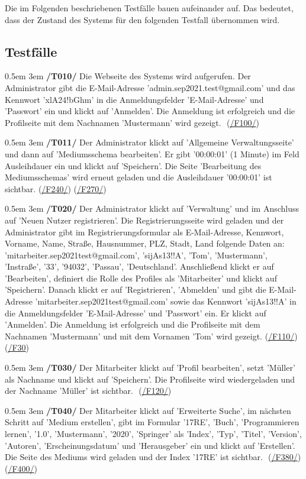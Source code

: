 \documentclass{article}
\newcommand{\specification}[3]{
	{\parindent 0.5em \hangindent 3em \hypertarget{spec:#1:#2}{\textbf{/#1#2/}} #3 \par \nobreak \vspace*{0.5em}}
}
\begin{document}
Die im Folgenden beschriebenen Testfälle bauen aufeinander auf. Das bedeutet, dass der Zustand des Systems für den folgenden Testfall übernommen wird.
\subsection{Testfälle}
\specification{T}{010}{Die Webseite des Systems wird aufgerufen. Der Administrator gibt die E-Mail-Adresse 'admin.sep2021.test@gmail.com' und das Kennwort 'xlA24!bGhm' in die Anmeldungsfelder 'E-Mail-Adresse' und 'Passwort' ein und klickt auf 'Anmelden'. Die Anmeldung ist erfolgreich und die Profilseite mit dem Nachnamen 'Mustermann' wird gezeigt. ­­­­­ (\hyperlink{spec:F:100}{/F100/}) }
\specification{T}{011}{Der Administrator klickt auf 'Allgemeine Verwaltungsseite' und dann auf 'Mediumsschema bearbeiten'. Er gibt '00:00:01' (1 Minute) im Feld Ausleihdauer ein und klickt auf 'Speichern'. Die Seite 'Bearbeitung des Mediumsschemas' wird erneut geladen und die Ausleihdauer '00:00:01' ist sichtbar. (\hyperlink{spec:F:240}{/F240/}) (\hyperlink{spec:F:270}{/F270/})}
\specification{T}{020}{Der Administrator klickt auf 'Verwaltung' und im Anschluss auf 'Neuen Nutzer registrieren'. Die Registrierungsseite wird geladen und der Administrator gibt im Registrierungsformular als E-Mail-Adresse, Kennwort, Vorname, Name, Straße, Hausnummer, PLZ, Stadt, Land folgende Daten an:  'mitarbeiter.sep2021test@gmail.com', 'sijAs13!!A', 'Tom', 'Mustermann', 'Instraße', '33', '94032', 'Passau', 'Deutschland'. Anschließend klickt er auf 'Bearbeiten', definiert die Rolle des Profiles als 'Mitarbeiter' und klickt auf 'Speichern'. Danach klickt er auf 'Registrieren', 'Abmelden' und gibt die E-Mail-Adresse 'mitarbeiter.sep2021test@gmail.com' sowie das Kennwort 'sijAs13!!A' in die Anmeldungsfelder 'E-Mail-Adresse' und 'Passwort' ein. Er klickt auf 'Anmelden'. Die Anmeldung ist erfolgreich und die Profilseite mit dem Nachnamen 'Mustermann' und mit dem Vornamen 'Tom' wird gezeigt. (\hyperlink{spec:F:110}{/F110/}) (\hyperlink{spec:F:30}{/F30}) }
\specification{T}{030}{Der Mitarbeiter klickt auf 'Profil bearbeiten', setzt 'Müller' als Nachname und klickt auf 'Speichern'. Die Profilseite wird wiedergeladen und der Nachname 'Müller' ist sichtbar. ­­­­­ (\hyperlink{spec:F:120}{/F120/}) }
\specification{T}{040}{Der Mitarbeiter klickt auf 'Erweiterte Suche', im nächsten Schritt auf 'Medium erstellen', gibt im Formular '17RE', 'Buch', 'Programmieren lernen', '1.0', 'Mustermann', '2020', 'Springer' als 'Index', 'Typ', 'Titel', 'Version', 'Autoren', 'Erscheinungsdatum' und 'Herausgeber' ein und klickt auf 'Erstellen'. Die Seite des Mediums wird geladen und der Index '17RE' ist sichtbar. ­­­­­ (\hyperlink{spec:F:380}{/F380/}) (\hyperlink{spec:F:400}{/F400/})}
\end{document}
